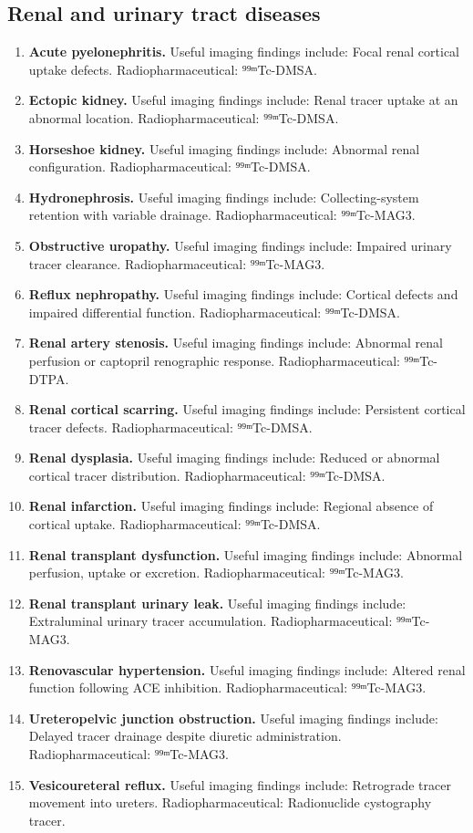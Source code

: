 \subsection{Renal and urinary tract diseases}
\begin{enumerate}[leftmargin=*,itemsep=0.45em,topsep=0.4em]
\item \textbf{Acute pyelonephritis.} Useful imaging findings include: Focal renal cortical uptake defects. Radiopharmaceutical: ⁹⁹ᵐTc-DMSA.
\item \textbf{Ectopic kidney.} Useful imaging findings include: Renal tracer uptake at an abnormal location. Radiopharmaceutical: ⁹⁹ᵐTc-DMSA.
\item \textbf{Horseshoe kidney.} Useful imaging findings include: Abnormal renal configuration. Radiopharmaceutical: ⁹⁹ᵐTc-DMSA.
\item \textbf{Hydronephrosis.} Useful imaging findings include: Collecting-system retention with variable drainage. Radiopharmaceutical: ⁹⁹ᵐTc-MAG3.
\item \textbf{Obstructive uropathy.} Useful imaging findings include: Impaired urinary tracer clearance. Radiopharmaceutical: ⁹⁹ᵐTc-MAG3.
\item \textbf{Reflux nephropathy.} Useful imaging findings include: Cortical defects and impaired differential function. Radiopharmaceutical: ⁹⁹ᵐTc-DMSA.
\item \textbf{Renal artery stenosis.} Useful imaging findings include: Abnormal renal perfusion or captopril renographic response. Radiopharmaceutical: ⁹⁹ᵐTc-DTPA.
\item \textbf{Renal cortical scarring.} Useful imaging findings include: Persistent cortical tracer defects. Radiopharmaceutical: ⁹⁹ᵐTc-DMSA.
\item \textbf{Renal dysplasia.} Useful imaging findings include: Reduced or abnormal cortical tracer distribution. Radiopharmaceutical: ⁹⁹ᵐTc-DMSA.
\item \textbf{Renal infarction.} Useful imaging findings include: Regional absence of cortical uptake. Radiopharmaceutical: ⁹⁹ᵐTc-DMSA.
\item \textbf{Renal transplant dysfunction.} Useful imaging findings include: Abnormal perfusion, uptake or excretion. Radiopharmaceutical: ⁹⁹ᵐTc-MAG3.
\item \textbf{Renal transplant urinary leak.} Useful imaging findings include: Extraluminal urinary tracer accumulation. Radiopharmaceutical: ⁹⁹ᵐTc-MAG3.
\item \textbf{Renovascular hypertension.} Useful imaging findings include: Altered renal function following ACE inhibition. Radiopharmaceutical: ⁹⁹ᵐTc-MAG3.
\item \textbf{Ureteropelvic junction obstruction.} Useful imaging findings include: Delayed tracer drainage despite diuretic administration. Radiopharmaceutical: ⁹⁹ᵐTc-MAG3.
\item \textbf{Vesicoureteral reflux.} Useful imaging findings include: Retrograde tracer movement into ureters. Radiopharmaceutical: Radionuclide cystography tracer.
\end{enumerate}

